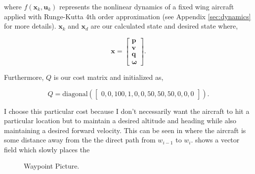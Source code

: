 \documentclass{article}
\begin{document}
where $f(\mathbf{x}_k,\mathbf{u}_k)$ represents the nonlinear dynamics of a fixed wing aircraft applied with Runge-Kutta 4th order approximation (see Appendix \ref{sec:dynamics} for more details). $\mathbf{x}_k$ and $\mathbf{x}_{d}$ are our calculated state and desired state where,

\begin{equation}
\label{eq:lqr_current_desired_states}
\mathbf{x}=\begin{bmatrix}\mathbf{p} \\ \mathbf{v} \\ \mathbf{q} \\ \boldsymbol{\omega}\end{bmatrix}.
\end{equation}

Furthermore, $Q$ is our cost matrix and initialized as,

\begin{equation}
Q = \text{diagonal}(\begin{bmatrix}
	0,0,100,1,0,0,50,50,50,0,0,0
\end{bmatrix}).
\end{equation}

I choose this particular cost because I don't necessarily want the aircraft to hit a particular location but to maintain a desired altitude and heading while also maintaining a desired forward velocity. This can be seen in  where the aircraft is some distance away from the the direct path from $w_{i-1}$ to $w_i$.  shows a vector field which slowly places the 

\begin{figure}
	\centering
	
	
	\caption{Waypoint Picture.}
	\label{fig:fw_waypoints}
	
\end{figure}
\end{document}
